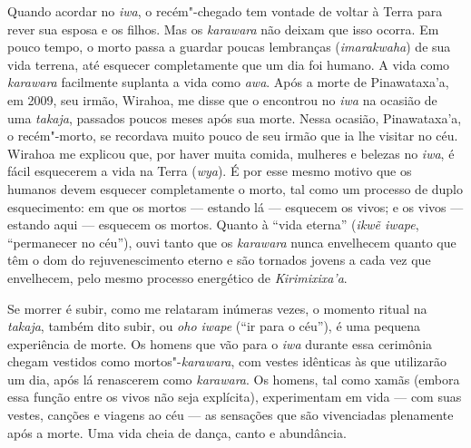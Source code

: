 Quando acordar no \emph{iwa}, o recém"-chegado tem vontade de voltar à
Terra para rever sua esposa e os filhos. Mas os \emph{karawara} não
deixam que isso ocorra. Em pouco tempo, o morto passa a guardar poucas
lembranças (\emph{imarakwaha}) de sua vida terrena, até esquecer
completamente que um dia foi humano. A vida como \emph{karawara}
facilmente suplanta a vida como \emph{awa}. Após a morte de
Pinawataxa'a, em 2009, seu irmão, Wirahoa, me disse que o encontrou no
\emph{iwa} na ocasião de uma \emph{takaja}, passados poucos meses após
sua morte. Nessa ocasião, Pinawataxa'a, o recém"-morto, se recordava
muito pouco de seu irmão que ia lhe visitar no céu. Wirahoa me explicou
que, por haver muita comida, mulheres e belezas no \emph{iwa}, é fácil
esquecerem a vida na Terra (\emph{wya}). É por esse mesmo motivo que os
humanos devem esquecer completamente o morto, tal como um processo de
duplo esquecimento: em que os mortos --- estando lá --- esquecem os vivos; e
os vivos --- estando aqui --- esquecem os mortos. Quanto à ``vida eterna''
(\emph{ikwẽ iwape}, ``permanecer no céu''), ouvi tanto que os
\emph{karawara} nunca envelhecem quanto que têm o dom do
rejuvenescimento eterno e são tornados jovens a cada vez que envelhecem,
pelo mesmo processo energético de \emph{Kirimixixa'a}.

Se morrer é subir, como me relataram inúmeras vezes, o momento ritual na
\emph{takaja}, também dito subir, ou \emph{oho iwape} (``ir para o céu''),
é uma pequena experiência de morte. Os homens que vão para o \emph{iwa}
durante essa cerimônia chegam vestidos como mortos"-\emph{karawara}, com
vestes idênticas às que utilizarão um dia, após lá renascerem como
\emph{karawara}. Os homens, tal como xamãs (embora essa função entre os
vivos não seja explícita), experimentam em vida --- com suas vestes,
canções e viagens ao céu --- as sensações que são vivenciadas plenamente
após a morte. Uma vida cheia de dança, canto e abundância.

